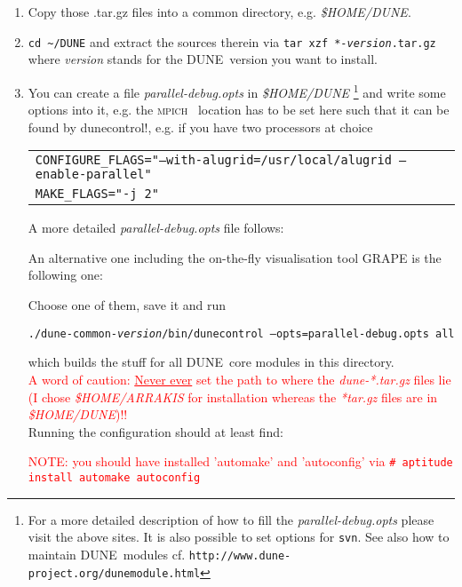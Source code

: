 \documentclass[a4paper,12pt]{article}
\newcommand{\dune}{\textsc{DUNE}\ }
\newcommand{\mpich}{\textsc{mpich}\ }
\newcommand{\dyeitred}{\textcolor{red}}{}
\begin{document}
\begin{enumerate}
  \item Copy those .tar.gz files into a common directory, e.g. \textit{\$HOME/DUNE}.
    \item \texttt{cd \textasciitilde/DUNE} and extract the sources therein via \texttt{tar xzf   *-\textit{version}.tar.gz} \newline where \textit{version} stands for the \dune version you want to install.
   \item You can create a file \textit{parallel-debug.opts} in \textit{\$HOME/DUNE} \footnote{For a more detailed
     description of how to fill the \textit{parallel-debug.opts} please visit the
   above sites. It is also possible to set options for \texttt{svn}. See also
   how to maintain \dune modules cf. \texttt{http://www.dune-project.org/dunemodule.html} } and write some
     options into it, e.g. the  \mpich
   location has to be set here such that it can be found by dunecontrol!,
     e.g. if you have two processors at choice\
      \begin{center}
        \begin{tabular}{l}
          \texttt{CONFIGURE\_FLAGS="--with-alugrid=/usr/local/alugrid --enable-parallel"}\\
            \texttt{MAKE\_FLAGS="-j 2"} 
         \end{tabular}
      \end{center} 
    A more detailed \textit{parallel-debug.opts} file follows:
    
    \begin{center}
     
    \end{center}

    An alternative one including the on-the-fly visualisation tool \textsc{GRAPE} is the following one:
    
    \begin{center}
      
    \end{center}


Choose one of them, save it and run \begin{center} \texttt{./dune-common-\textit{version}/bin/dunecontrol
  --opts=parallel-debug.opts all}\end{center}
 which builds the stuff for all \dune core modules in this directory.\\
\dyeitred{A word of caution: \underline{Never ever} set the path to where the
    \textit{dune-*.tar.gz} files lie (I chose \textit{\$HOME/ARRAKIS} for
    installation whereas the \textit{*tar.gz} files are in \textit{\$HOME/DUNE})!!}\\
Running the configuration should at least find:

\dyeitred{NOTE: you should have installed 'automake' and 'autoconfig' via \texttt{\# aptitude install automake autoconfig}}


\end{enumerate}
\end{document}

